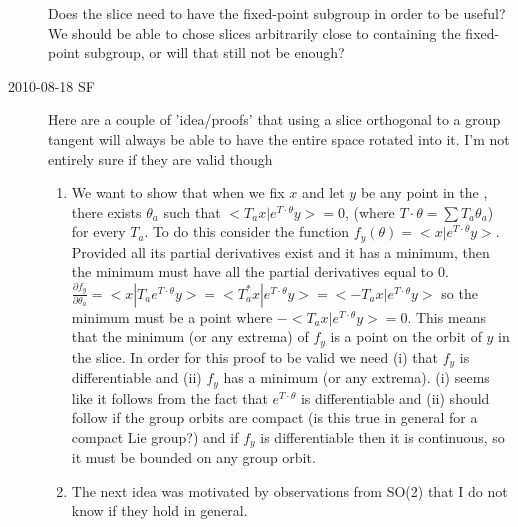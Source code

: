 \begin{description}
Does the slice need to have the fixed-point subgroup in order to be useful? We should be able to chose slices arbitrarily close to containing the fixed-point subgroup, or will that still not be enough?

\item[2010-08-18 SF]
Here are a couple of 'idea/proofs' that using a slice orthogonal to a group tangent will always be able to have the entire space rotated into it. I'm not entirely sure if they are valid though
\begin{enumerate}
    \item
We want to show that when we fix $x$ and let $y$ be any point in the {\statesp}, there exists $\theta_a$ such that $<T_a x|e^{T\cdot \theta}y>=0$, (where $T \cdot \theta=\sum T_a \theta_a$) for every $T_a$.
To do this consider the function $f_y(\theta)=<x|e^{T \cdot \theta} y>$. Provided all its partial derivatives exist and it has a minimum, then the minimum must have all the partial derivatives equal to 0. $\frac{\partial f_y}{\partial \theta_a}=<x|T_a e^{T \cdot \theta} y>=<T_a^* x|e^{T \cdot \theta} y>=<-T_a x|e^{T \cdot \theta} y>$ so the minimum must be a point where $-<T_a x|e^{T \cdot \theta} y>=0$. This means that the minimum (or any extrema) of $f_y$ is a point on the orbit of $y$ in the slice.
In order for this proof to be valid we need (i) that $f_y$ is differentiable and (ii) $f_y$ has a minimum (or any extrema). (i) seems like it follows from the fact that $e^{T \cdot \theta}$ is differentiable and (ii) should follow if the group orbits are compact (is this true in general for a compact Lie group?) and if $f_y$ is differentiable then it is continuous, so it must be bounded on any group orbit.
    \item
The next idea was motivated by observations from SO(2) that I do not know if they hold in general.


\end{enumerate}
\end{description}
